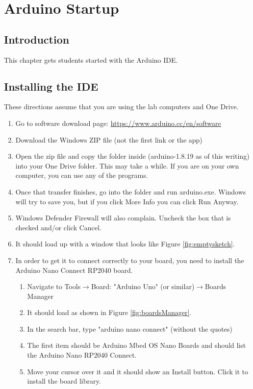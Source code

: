 \chapter{Arduino Startup}

\section{Introduction}
This chapter gets students started with the Arduino IDE.

\section{Installing the IDE}
These directions assume that you are using the lab computers and One Drive.
\begin{enumerate}
	\item Go to software download page: \href{https://www.arduino.cc/en/software}{https://www.arduino.cc/en/software}
	\item Download the Windows ZIP file (not the first link or the app)
	\item Open the zip file and copy the folder inside (arduino-1.8.19 as of this writing) into your One Drive folder. This may take a while. If you are on your own computer, you can use any of the programs.
	\item Once that transfer finishes, go into the folder and run arduino.exe. Windows will try to save you, but if you click More Info you can click Run Anyway.
	\item Windows Defender Firewall will also complain. Uncheck the box that is checked and/or click Cancel.
	\item It should load up with a window that looks like Figure \ref{fig:emptysketch}.
	\item In order to get it to connect correctly to your board, you need to install the Arduino Nano Connect RP2040 board.
	\begin{enumerate}
		\item Navigate to Tools$\rightarrow$Board: "Arduino Uno" (or similar)$\rightarrow$Boards Manager
		\item It should load as shown in Figure \ref{fig:boardsManager}.
		\item In the search bar, type "arduino nano connect" (without the quotes)
		\item The first item should be Arduino Mbed OS Nano Boards and should list the Arduino Nano RP2040 Connect.
		\item Move your cursor over it and it should show an Install button. Click it to install the board library.

\end{enumerate}
\end{enumerate}
